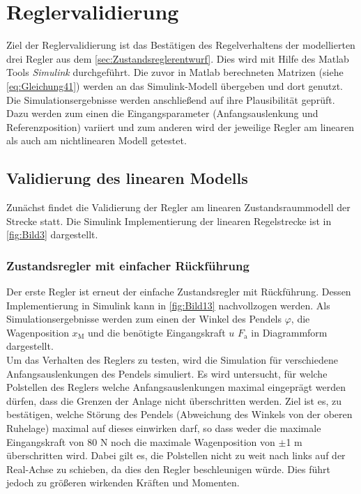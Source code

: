 \section{Reglervalidierung} \label{sec:reglervalidierung}

Ziel der Reglervalidierung ist das Bestätigen des Regelverhaltens der modellierten drei Regler aus dem \autoref{sec:Zustandsreglerentwurf}. Dies wird mit Hilfe des Matlab Tools \textit{Simulink} durchgeführt. Die zuvor in Matlab berechneten Matrizen (siehe \zB \autoref{eq:Gleichung41}) werden an das Simulink-Modell übergeben und dort genutzt. Die Simulationsergebnisse werden anschließend auf ihre Plausibilität geprüft. Dazu werden zum einen die Eingangsparameter (Anfangsauslenkung und Referenzposition) variiert und zum anderen wird der jeweilige Regler am linearen als auch am nichtlinearen Modell getestet.

\subsection{Validierung des linearen Modells}

Zunächst findet die Validierung der Regler am linearen Zustandsraummodell der Strecke statt. Die Simulink Implementierung der linearen Regelstrecke ist in \autoref{fig:Bild3} dargestellt.

\subsubsection{Zustandsregler mit einfacher Rückführung} \label{sec:val-acker}

Der erste Regler ist erneut der einfache Zustandsregler mit Rückführung. Dessen Implementierung in Simulink kann in \autoref{fig:Bild13} nachvollzogen werden. Als Simulationsergebnisse werden zum einen der Winkel des Pendels $\varphi$, die Wagenposition $x_{\mathrm{M}}$ und die benötigte Eingangskraft $u$ \bzw $F_{\mathrm{a}}$ in Diagrammform dargestellt. \\
Um das Verhalten des Reglers zu testen, wird die Simulation für verschiedene Anfangsauslenkungen des Pendels simuliert. Es wird untersucht, für welche Polstellen des Reglers welche Anfangsauslenkungen maximal eingeprägt werden dürfen, dass die Grenzen der Anlage nicht überschritten werden. Ziel ist es, zu bestätigen, welche Störung des Pendels (Abweichung des Winkels von der oberen Ruhelage) maximal auf dieses einwirken darf, so dass weder die maximale Eingangskraft von 80 N noch die maximale Wagenposition von $\pm$1 m überschritten wird. Dabei gilt es, die Polstellen nicht zu weit nach links auf der Real-Achse zu schieben, da dies den Regler beschleunigen würde. Dies führt jedoch zu größeren wirkenden Kräften und Momenten.

